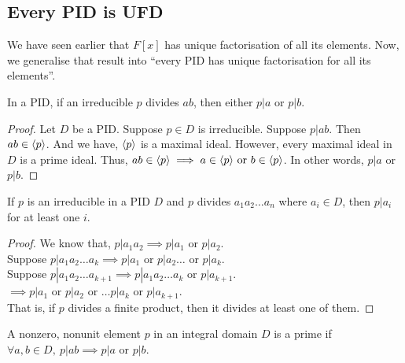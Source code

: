 \subsection{Every PID is UFD}
	We have seen earlier that $F[x]$ has unique factorisation of all its elements.
	Now, we generalise that result into ``every PID has unique factorisation for all its elements''.

\begin{lemma}
	In a PID, if an irreducible $p$ divides $ab$, then either $p|a$ or $p|b$.
\end{lemma}
\begin{proof}
	Let $D$ be a PID.
	Suppose $p \in D$ is irreducible.
	Suppose $p | ab$.
	Then $ab \in \langle p\rangle$.
	And we have, $\langle p\rangle$ is a maximal ideal.
	However, every maximal ideal in $D$ is a prime ideal.
	Thus, $ab \in \langle p\rangle \implies a \in \langle p\rangle \text{ or } b \in \langle p\rangle$.
	In other words, $p | a$ or $p | b$.
\end{proof}

\begin{corollary}
	If $p$ is an irreducible in a PID $D$ and $p$ divides $a_1a_2\dots a_n$ where $a_i \in D$, then $p|a_i$ for at least one $i$.
\end{corollary}
\begin{proof}
	We know that, $p | a_1a_2 \implies p | a_1 \text{ or } p | a_2$.\\
	Suppose $p | a_1a_2\dots a_k \implies p| a_1 \text{ or } p | a_2 \dots \text{ or } p | a_k$.\\
	Suppose $p | a_1a_2\dots a_{k+1} \implies p | a_1a_2\dots a_k \text{ or } p | a_{k+1}$.\\
	$\implies p|a_1 \text{ or } p|a_2 \text{ or } \dots p|a_k \text{ or } p | a_{k+1}$.\\
	That is, if $p$ divides a finite product, then it divides at least one of them.
\end{proof}

\begin{definition}
	A nonzero, nonunit element $p$ in an integral domain $D$ is a prime if $\forall a,b \in D,\ p|ab \implies p|a \text{ or } p|b$.
\end{definition}

